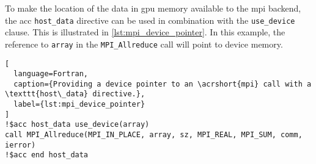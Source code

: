 To make the location of the data in \acrshort{gpu} memory available to the \acrshort{mpi} backend, the \acrshort{acc} \texttt{host\_data} directive can be used in combination with the \texttt{use\_device} clause. This is illustrated in \autoref{lst:mpi_device_pointer}. In this example, the reference to \texttt{array} in the \texttt{MPI\_Allreduce} call will point to device memory.

\begin{lstlisting}[
  language=Fortran,
  caption={Providing a device pointer to an \acrshort{mpi} call with a \texttt{host\_data} directive.},
  label={lst:mpi_device_pointer}
]
!$acc host_data use_device(array)
call MPI_Allreduce(MPI_IN_PLACE, array, sz, MPI_REAL, MPI_SUM, comm, ierror)
!$acc end host_data
\end{lstlisting}
